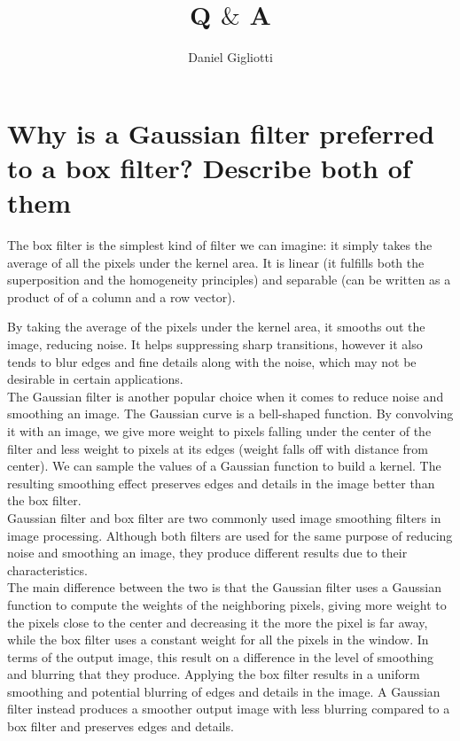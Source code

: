 \documentclass{article}
\title{Q $\&$ A}
\author{Daniel Gigliotti}
\date{}
\begin{document}
\maketitle

\newpage

\section*{Why is a Gaussian filter preferred to a box filter? Describe both of them}

The box filter is the simplest kind of filter we can imagine: it simply takes the average of all the pixels under the kernel area. It is linear (it fulfills both the superposition and the homogeneity principles) and separable (can be written as a product of of a column and a row vector). 

By taking the average of the pixels under the kernel area, it smooths out the image, reducing noise. It helps suppressing sharp transitions, however it also tends to blur edges and fine details along with the noise, which may not be desirable in certain applications. \\

The Gaussian filter is another popular choice when it comes to reduce noise and smoothing an image. The Gaussian curve is a bell-shaped function. By convolving it with an image, we give more weight to pixels falling under the center of the filter and less weight to pixels at its edges (weight falls off with distance from center). We can sample the values of a Gaussian function to build a kernel. The resulting smoothing effect preserves edges and details in the image better than the box filter. \\

Gaussian filter and box filter are two commonly used image smoothing filters in image processing. Although both filters are used for the same purpose of reducing noise and smoothing an image, they produce different results due to their characteristics. \\

The main difference between the two is that the Gaussian filter uses a Gaussian function to compute the weights of the neighboring pixels, giving more weight to the pixels close to the center and decreasing it the more the pixel is far away, while the box filter uses a constant weight for all the pixels in the window. In terms of the output image, this result on a difference in the level of smoothing and blurring that they produce. Applying the box filter results in a uniform smoothing and potential blurring of edges and details in the image. A Gaussian filter instead produces a smoother output image with less blurring compared to a box filter and preserves edges and details. \\
\end{document}
